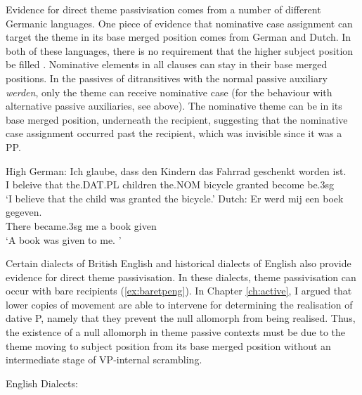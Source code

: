 Evidence for direct theme passivisation comes from a number of different Germanic languages. One piece of evidence that nominative case assignment can target the theme in its base merged position comes from German and Dutch. In both of these languages, there is no requirement that the higher subject position be filled \citep{Besten.1990}. Nominative elements in all clauses can stay in their base merged positions. In the passives of ditransitives with the normal passive auxiliary \textit{werden}, only the theme can receive nominative case (for the behaviour with alternative passive auxiliaries, see above). The nominative theme can be in its base merged position, underneath the recipient, suggesting that the nominative case assignment occurred past the recipient, which was invisible since it was a PP.

\begin{exe}
	\ex High German:\label{ex:hg-insitu-sbj}
\gll Ich glaube, dass den Kindern das Fahrrad geschenkt worden ist.\\
I beleive that the.DAT.PL children the.NOM bicycle granted become be.3sg\\
\trans `I believe that the child was granted the bicycle.'
\ex Dutch:\label{ex:dut-insitu-sbj}
\gll Er werd mij een boek gegeven.\\
There became.3sg me a book given\\
\trans `A book was given to me. \cite[pg 245]{Donaldson.2008}'
\end{exe}

Certain dialects of British English and historical dialects of English also provide evidence for direct theme passivisation. In these dialects, theme passivisation can occur with bare recipients (\ref{ex:baretpeng}). In Chapter \ref{ch:active}, I argued that lower copies of movement are able to intervene for determining the realisation of dative P, namely that they prevent the null allomorph from being realised. Thus, the existence of a null allomorph in theme passive contexts must be due to the theme moving to subject position from its base merged position without an intermediate stage of VP-internal scrambling.

\begin{exe}
	\ex English Dialects: \label{ex:eng-directtheme}
		\begin{xlist}
		\end{xlist}
\end{exe}


